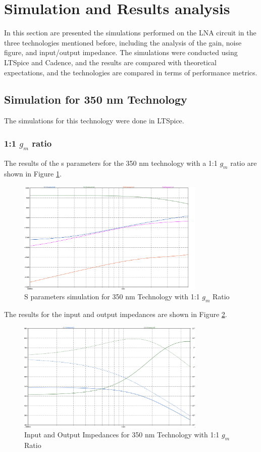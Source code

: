 \section{Simulation and Results analysis}

In this section are presented the simulations performed on the LNA circuit in the three technologies mentioned before, including the analysis of the gain, noise figure, and input/output impedance. The simulations were conducted using LTSpice and Cadence, and the results are compared with theoretical expectations, and the technologies are compared in terms of performance metrics.

\subsection{Simulation for 350 nm Technology}

The simulations for this technology were done in LTSpice.
\subsubsection{1:1 $g_m$ ratio}

The results of the s parameters for the 350 nm technology with a 1:1 $g_m$ ratio are shown in Figure \ref{fig:350nm_1to1}. 
\begin{figure}[H]
    \centering
    \includegraphics[width=0.8\textwidth]{Images/3501to1SParam.png}
    \caption{S parameters simulation for 350 nm Technology with 1:1 $g_m$ Ratio}
    \label{fig:350nm_1to1}
\end{figure}

The results for the input and output impedances are shown in Figure \ref{fig:350nm_1to1-Z}.

\begin{figure}[H]
    \centering
    \includegraphics[width=0.8\textwidth]{Images/3501to1ZParam.png}
    \caption{Input and Output Impedances for 350 nm Technology with 1:1 $g_m$ Ratio}
    \label{fig:350nm_1to1-Z}
\end{figure}

